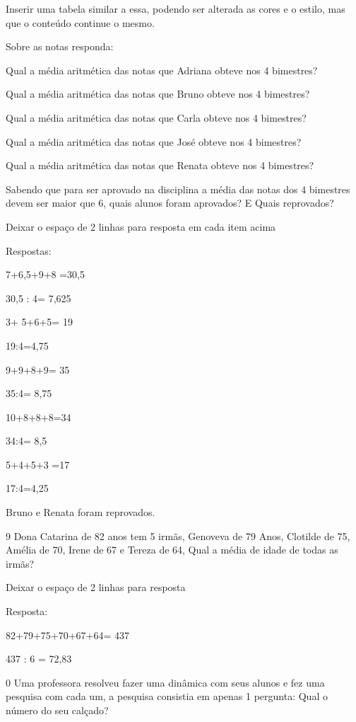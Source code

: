 Inserir uma tabela similar a essa, podendo ser alterada as cores e o
estilo, mas que o conteúdo continue o mesmo.

Sobre as notas responda:

\item Qual a média aritmética das notas que Adriana obteve nos 4 bimestres?
\item Qual a média aritmética das notas que Bruno obteve nos 4 bimestres?
\item Qual a média aritmética das notas que Carla obteve nos 4 bimestres?
\item Qual a média aritmética das notas que José obteve nos 4 bimestres?
\item Qual a média aritmética das notas que Renata obteve nos 4 bimestres?
\item Sabendo que para ser aprovado na disciplina a média das notas dos 4
bimestres devem ser maior que 6, quais alunos foram aprovados? E Quais
reprovados?

Deixar o espaço de 2 linhas para resposta em cada item acima

Respostas:

\item 

7+6,5+9+8 =30,5

30,5 : 4= 7,625

\item 3+ 5+6+5= 19

19:4=4,75

\item 9+9+8+9= 35

35:4= 8,75

\item 10+8+8+8=34

34:4= 8,5

\item 5+4+5+3 =17

17:4=4,25

\item Bruno e Renata foram reprovados.

\num{9} Dona Catarina de 82 anos tem 5 irmãs, Genoveva de 79 Anos, Clotilde
de 75, Amélia de 70, Irene de 67 e Tereza de 64, Qual a média de idade
de todas as irmãs?

Deixar o espaço de 2 linhas para resposta

Resposta:

82+79+75+70+67+64= 437

437 : 6 = 72,83

\num{0} Uma professora resolveu fazer uma dinâmica com seus alunos e fez uma
pesquisa com cada um, a pesquisa consistia em apenas 1 pergunta: Qual o
número do seu calçado?

